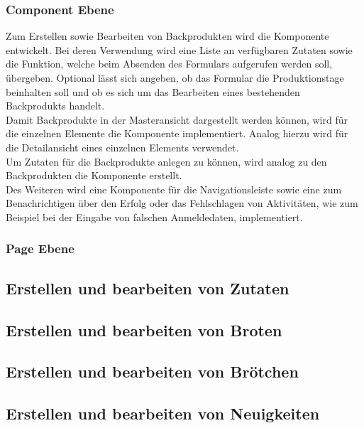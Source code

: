 \subsubsection{Component Ebene}
Zum Erstellen sowie Bearbeiten von Backprodukten wird die Komponente  entwickelt. Bei deren Verwendung wird eine Liste an verfügbaren Zutaten sowie die Funktion, welche beim Absenden des Formulars aufgerufen werden soll, übergeben. Optional lässt sich angeben, ob das Formular die Produktionstage beinhalten soll und ob es sich um das Bearbeiten eines bestehenden Backprodukts handelt.
\\
Damit Backprodukte in der Masteransicht dargestellt werden können, wird für die einzelnen Elemente die Komponente  implementiert. Analog hierzu wird  für die Detailansicht eines einzelnen Elements verwendet.
\\
Um Zutaten für die Backprodukte anlegen zu können, wird analog zu den Backprodukten die Komponente  erstellt.
\\
Des Weiteren wird eine Komponente für die Navigationsleiste sowie eine zum Benachrichtigen über den Erfolg oder das Fehlschlagen von Aktivitäten, wie zum Beispiel bei der Eingabe von falschen Anmeldedaten, implementiert.

\clearpage

\subsubsection{Page Ebene}

\clearpage

\subsection{Erstellen und bearbeiten von Zutaten}

\subsection{Erstellen und bearbeiten von Broten}

\subsection{Erstellen und bearbeiten von Brötchen}

\subsection{Erstellen und bearbeiten von Neuigkeiten}